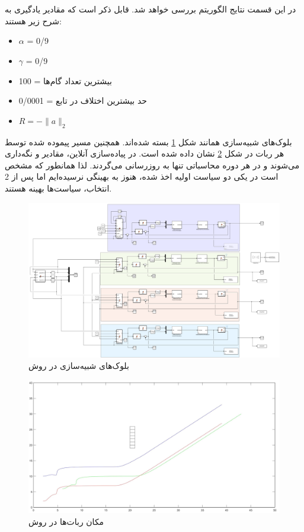 \section{}
در این قسمت نتایج الگوریتم  بررسی خواهد شد. قابل ذکر است که مقادیر یادگیری به شرح زیر هستند:
\begin{itemize}
	\item $\alpha$ = 0/9
	\item $\gamma$ = 0/9
	\item بیشترین تعداد گام‌ها = 100
	\item حد بیشترین اختلاف در تابع  = 0/0001
	\item $R=-\|a\|_2$
\end{itemize}

بلوک‌های شبیه‌سازی همانند شکل \ref{Fig platoon-QL} بسته شده‌اند. همچنین مسیر پیموده شده توسط هر ربات در شکل \ref{Fig platoon-QL-pos} نشان داده شده است. در پیاده‌سازی آنلاین، مقادیر  و  نگه‌داری می‌شوند و در هر دوره محاسباتی تنها به روزرسانی می‌گردند. لذا همانطور که مشخص است در یکی دو سیاست اولیه اخذ شده، هنوز به بهینگی نرسیده‌ایم اما پس از 2 انتخاب، سیاست‌ها بهینه هستند.
\begin{figure}[!h]
	\centering
	\includegraphics[scale=0.25]{Images/platoon-QL.png}
	\caption{بلوک‌های شبیه‌سازی در روش }\label{Fig platoon-QL}
\end{figure}

\begin{figure}[!h]
	\centering
	\includegraphics[scale=0.2]{Images/platoon-QL-pos.jpg}
	\caption{مکان ربات‌ها در روش }\label{Fig platoon-QL-pos}
\end{figure}

